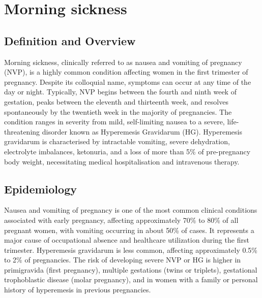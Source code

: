 \chapter{Morning sickness}

\section*{Definition and Overview}
Morning sickness, clinically referred to as nausea and vomiting of pregnancy (NVP), is a highly common condition affecting women in the first trimester of pregnancy. Despite its colloquial name, symptoms can occur at any time of the day or night. Typically, NVP begins between the fourth and ninth week of gestation, peaks between the eleventh and thirteenth week, and resolves spontaneously by the twentieth week in the majority of pregnancies. The condition ranges in severity from mild, self-limiting nausea to a severe, life-threatening disorder known as Hyperemesis Gravidarum (HG). Hyperemesis gravidarum is characterised by intractable vomiting, severe dehydration, electrolyte imbalances, ketonuria, and a loss of more than 5\% of pre-pregnancy body weight, necessitating medical hospitalisation and intravenous therapy.

\section*{Epidemiology}
Nausea and vomiting of pregnancy is one of the most common clinical conditions associated with early pregnancy, affecting approximately 70\% to 80\% of all pregnant women, with vomiting occurring in about 50\% of cases. It represents a major cause of occupational absence and healthcare utilization during the first trimester. Hyperemesis gravidarum is less common, affecting approximately 0.5\% to 2\% of pregnancies. The risk of developing severe NVP or HG is higher in primigravida (first pregnancy), multiple gestations (twins or triplets), gestational trophoblastic disease (molar pregnancy), and in women with a family or personal history of hyperemesis in previous pregnancies.

